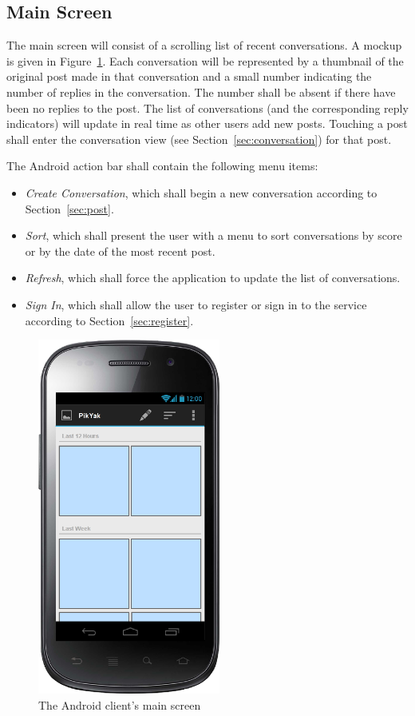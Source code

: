 \documentclass[11pt]{scrartcl}
\begin{document}
    \subsection{Main Screen}
        The main screen will consist of a scrolling list of recent conversations.
        A mockup is given in Figure~\ref{fig:mainscreen}.
        Each conversation will be represented by a thumbnail of the original post made in that conversation and a small number indicating the number of replies in the conversation.
        The number shall be absent if there have been no replies to the post.
        The list of conversations (and the corresponding reply indicators) will update in real time as other users add new posts.
        Touching a post shall enter the conversation view (see Section~\ref{sec:conversation}) for that post.

        The Android action bar shall contain the following menu items:

        \begin{itemize}
            \item \emph{Create Conversation}, which shall begin a new conversation according to Section~\ref{sec:post}.
            \item \emph{Sort}, which shall present the user with a menu to sort conversations by score or by the date of the most recent post.
            \item \emph{Refresh}, which shall force the application to update the list of conversations.
            \item \emph{Sign In}, which shall allow the user to register or sign in to the service according to Section~\ref{sec:register}.
        \end{itemize}

        \begin{figure}[h]
            \centering \includegraphics[width=6cm,keepaspectratio]{mockups/main}
            \caption{The Android client's main screen}
            \label{fig:mainscreen}
        \end{figure}
\end{document}
